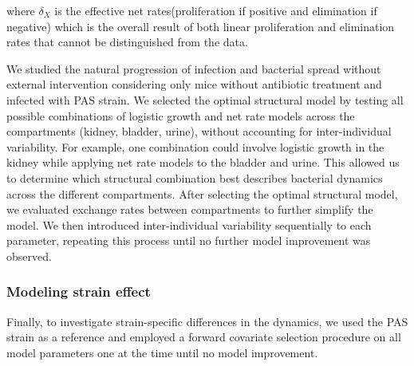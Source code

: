 \documentclass{article}
\begin{document}
where $\delta_X$ is the effective net rates(proliferation if positive and elimination if negative) which is the overall result of both linear proliferation and elimination rates that cannot be distinguished from the data.




We studied the natural progression of infection and bacterial spread without external intervention considering only mice without antibiotic treatment and infected with PAS strain. We selected the optimal structural model by testing all possible combinations of logistic growth and net rate models across the compartments (kidney, bladder, urine), without accounting for inter-individual variability. For example, one combination could involve logistic growth in the kidney while applying net rate models to the bladder and urine. This allowed us to determine which structural combination best describes bacterial dynamics across the different compartments.
%
After selecting the optimal structural model, we evaluated exchange rates between compartments to further simplify the model. We then introduced inter-individual variability sequentially to each parameter, repeating this process until no further model improvement was observed.


\subsubsection{Modeling strain effect}

Finally, to investigate strain-specific differences in the dynamics, we used the PAS strain as a reference and employed a forward covariate selection procedure on all model parameters one at the time until no model improvement.


\end{document}
